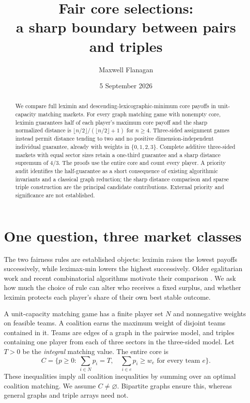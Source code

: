 \documentclass[11pt]{article}
\title{Fair core selections:\\a sharp boundary between pairs and triples}
\author{Maxwell Flanagan}
\date{5 September 2026}
\begin{document}
\maketitle
\begin{abstract}
We compare full leximin and descending-lexicographic-minimum core payoffs
in unit-capacity matching markets. For every graph matching game with nonempty
core, leximin guarantees half of each player's maximum core payoff and the
sharp normalized distance is $\lfloor n/2\rfloor/(\lfloor n/2\rfloor+1)$ for
$n\ge4$. Three-sided assignment games instead permit distance tending to two
and no positive dimension-independent individual guarantee, already with
weights in $\{0,1,2,3\}$. Complete additive three-sided markets with equal sector sizes retain
a one-third guarantee and a sharp distance supremum of $4/3$.
The proofs use the entire core and count every player. A priority audit
identifies the half-guarantee as a short consequence of existing
algorithmic invariants and a classical graph reduction; the sharp distance comparison and sparse triple
construction are the principal candidate contributions. External priority
and significance are not established.
\end{abstract}

\section{One question, three market classes}
The two fairness rules are established objects: leximin raises the lowest
payoffs successively, while leximax-min lowers the highest successively.
Older egalitarian work and recent combinatorial algorithms motivate their
comparison \cite{klijn,vazirani}. We ask how much the choice of rule can alter
who receives a fixed surplus, and whether leximin protects each player's
share of their own best stable outcome.

A unit-capacity matching game has a finite player set $N$ and nonnegative
weights on feasible teams. A coalition earns the maximum weight of disjoint
teams contained in it. Teams are edges of a graph in the pairwise model, and
triples containing one player from each of three sectors in the three-sided
model. Let $T>0$ be the \emph{integral} matching value. The entire core is
\begin{equation}\label{eq:core}
 C=\{p\ge0:\ \textstyle\sum_{i\in N}p_i=T,\quad
                    \sum_{i\in e}p_i\ge w_e\text{ for every team }e\}.
\end{equation}
These inequalities imply all coalition inequalities by summing over an
optimal coalition matching. We assume $C\ne\varnothing$. Bipartite graphs
ensure this, whereas general graphs and triple arrays need not.
\end{document}
